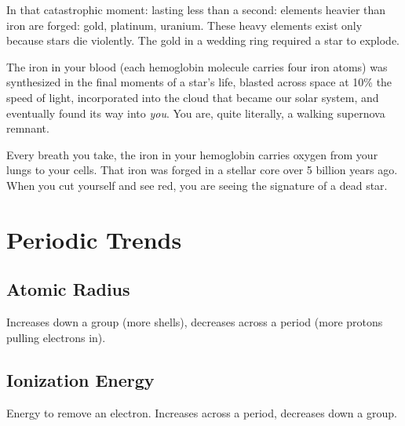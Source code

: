 \documentclass[
  11pt,
  letterpaper,
  twoside,
  openright]{book}
\begin{document}
In that catastrophic moment: lasting less than a second: elements
heavier than iron are forged: gold, platinum, uranium. These heavy
elements exist only because stars die violently. The gold in a wedding
ring required a star to explode.

The iron in your blood (each hemoglobin molecule carries four iron
atoms) was synthesized in the final moments of a star's life, blasted
across space at 10\% the speed of light, incorporated into the cloud
that became our solar system, and eventually found its way into
\emph{you}. You are, quite literally, a walking supernova remnant.

\begin{tcolorbox}[enhanced jigsaw, coltitle=black, colbacktitle=quarto-callout-note-color!10!white, toprule=.15mm, colframe=quarto-callout-note-color-frame, arc=.35mm, opacityback=0, bottomtitle=1mm, toptitle=1mm, breakable, colback=white, titlerule=0mm, opacitybacktitle=0.6, title=\textcolor{quarto-callout-note-color}{\faInfo}\hspace{0.5em}{The Cosmic Origin of Blood}, rightrule=.15mm, bottomrule=.15mm, leftrule=.75mm, left=2mm]

Every breath you take, the iron in your hemoglobin carries oxygen from
your lungs to your cells. That iron was forged in a stellar core over 5
billion years ago. When you cut yourself and see red, you are seeing the
signature of a dead star.

\end{tcolorbox}

\section{Periodic Trends}\label{periodic-trends}

\subsection{Atomic Radius}\label{atomic-radius}

Increases down a group (more shells), decreases across a period (more
protons pulling electrons in).

\subsection{Ionization Energy}\label{ionization-energy}

Energy to remove an electron. Increases across a period, decreases down
a group.
\end{document}
